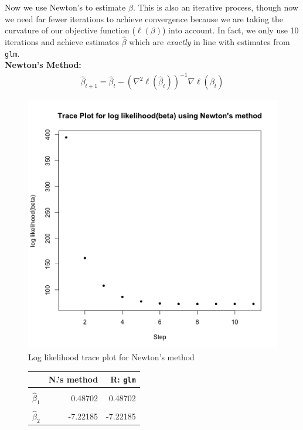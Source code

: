 \documentclass{article}
\begin{document}
\begin{enumerate}[label=(\Alph*)]
{Now we use Newton's to estimate $\beta$. This is also an iterative process, though now we need far fewer iterations to achieve convergence because we are taking the curvature of our objective function ($\ell(\beta)$) into account. In fact, we only use 10 iterations and achieve estimates $\hat{\beta}$ which are \emph{exactly} in line with estimates from \texttt{glm}. \\
\textbf{Newton's Method:} 
\begin{align}
	\hat{\beta}_{t+1} = \hat{\beta}_t - (\nabla^2\ell(\hat{\beta}_t))^{-1}\nabla\ell(\hat{\beta_t})
\end{align}
		\begin{figure}[htp!]
		\centering
			\includegraphics[scale=0.5]{beta_newton.png}
			\caption{Log likelihood trace plot for Newton's method}
		\end{figure}
\begin{figure}[htp!]
		\centering
		\label{my-label2}
		\begin{tabular}{l|r|r}
		                        & N.'s method & R: \texttt{glm} \\ \hline
								\\[-1em]
		$\hat{\beta}_1$      & 0.48702           & 0.48702         \\  \hline
		\\[-1em]
		$\hat{\beta}_2$      & -7.22185          & -7.22185         \\ \hline

\end{tabular}
\end{figure}}
\end{enumerate}
\end{document}
